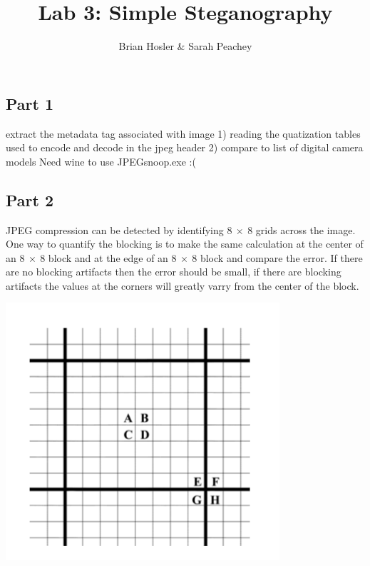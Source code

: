 \documentclass{article}
\begin{document}
\title{Lab 3: Simple Steganography}
\author{Brian Hosler \& Sarah Peachey }
\maketitle 

    

\subsection*{Part 1}

\begin{par}
extract the metadata tag associated with image   1) reading the quatization tables used to encode and decode in the   jpeg header   2) compare to list of digital camera models Need wine to use JPEGsnoop.exe :(
\end{par} \vspace{1em}


\subsection*{Part 2}

\qquad JPEG compression can be detected by identifying $8 \ \times \ 8$
grids across the image. One way to quantify the blocking is to make the same
calculation at the center of an $8 \ \times \ 8$ block and at the edge of an
$8 \ \times \ 8$ block and compare the error. If there are no blocking
artifacts then the error should be small, if there are blocking artifacts
the values at the corners will greatly varry from the center of the block. 

\includegraphics [width=4in]{block}
\end{document}
